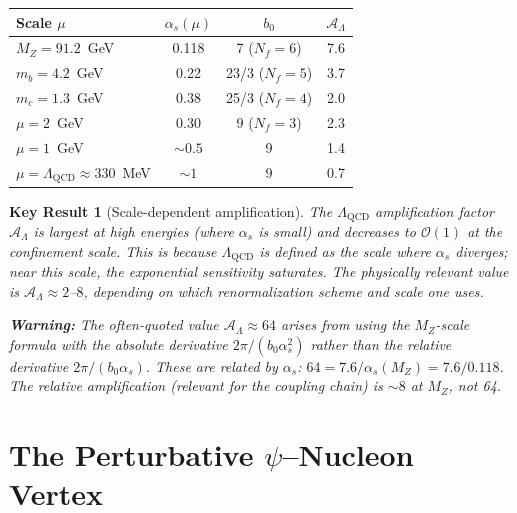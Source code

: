 \documentclass[aps,prd,twocolumn,superscriptaddress,floatfix,nofootinbib]{revtex4-2}
\renewcommand{\order}[1]{\mathcal{O}\!\left(#1\right)}
\newcommand{\LQCD}{\Lambda_{\mathrm{QCD}}}
\newcommand{\as}{\alpha_s}
\newtheorem{result}{Key Result}
\begin{document}
\begin{center}
\renewcommand{\arraystretch}{1.3}
\begin{tabular}{lccc}
\toprule
\textbf{Scale $\mu$} & $\as(\mu)$ & $b_0$ & $\mathcal{A}_\Lambda$ \\
\midrule
$M_Z = 91.2$~GeV & 0.118 & 7 ($N_f = 6$) & 7.6 \\
$m_b = 4.2$~GeV & 0.22 & 23/3 ($N_f = 5$) & 3.7 \\
$m_c = 1.3$~GeV & 0.38 & 25/3 ($N_f = 4$) & 2.0 \\
$\mu = 2$~GeV & 0.30 & 9 ($N_f = 3$) & 2.3 \\
$\mu = 1$~GeV & $\sim 0.5$ & 9 & 1.4 \\
$\mu = \LQCD \approx 330$~MeV & $\sim 1$ & 9 & 0.7 \\
\bottomrule
\end{tabular}
\end{center}

\begin{result}[Scale-dependent amplification]
The $\LQCD$ amplification factor $\mathcal{A}_\Lambda$ is largest at high
energies (where $\as$ is small) and decreases to $\order{1}$ at the
confinement scale. This is because $\LQCD$ is defined as the scale where
$\as$ diverges; near this scale, the exponential sensitivity saturates.
The physically relevant value is $\mathcal{A}_\Lambda \approx 2$--$8$,
depending on which renormalization scheme and scale one uses.

\textbf{Warning:} The often-quoted value $\mathcal{A}_\Lambda \approx 64$
arises from using the $M_Z$-scale formula with the \emph{absolute}
derivative $2\pi/(b_0 \as^2)$ rather than the \emph{relative} derivative
$2\pi/(b_0 \as)$. These are related by $\as$:
$64 = 7.6/\as(M_Z) = 7.6/0.118$. The relative amplification (relevant
for the coupling chain) is $\sim 8$ at $M_Z$, not 64.
\end{result}


\section{The Perturbative $\psi$--Nucleon Vertex}\label{sec:nucleon_response}

\end{document}
